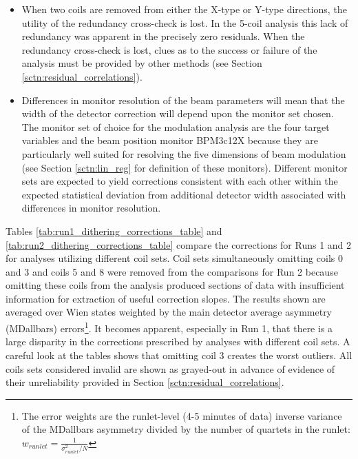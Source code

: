 \begin{itemize}
\item{When two coils are removed from either the X-type or Y-type directions, the utility of the redundancy cross-check is lost. In the 5-coil analysis this lack of redundancy was apparent in the precisely zero residuals. When the redundancy cross-check is lost, clues as to the success or failure of the analysis must be provided by other methods (see Section \ref{sctn:residual_correlations}).}
\item{Differences in monitor resolution of the beam parameters will mean that the width of the detector correction will depend upon the monitor set chosen. The monitor set of choice for the modulation analysis are the four target variables and the beam position monitor BPM3c12X because they are particularly well suited for resolving the five dimensions of beam modulation (see Section \ref{sctn:lin_reg} for definition of these monitors). Different monitor sets are expected to yield corrections consistent with each other within the expected statistical deviation from additional detector width associated with differences in monitor resolution.}
\end{itemize}

Tables \ref{tab:run1_dithering_corrections_table} and \ref{tab:run2_dithering_corrections_table} compare the corrections for Runs 1 and 2 for analyses utilizing different coil sets. Coil sets simultaneously omitting coils 0 and 3 and coils 5 and 8 were removed from the comparisons for Run 2 because omitting these coils from the analysis produced sections of data with insufficient information for extraction of useful correction slopes. The results shown are averaged over Wien states weighted by the main detector average asymmetry (MDallbars) errors\footnote{The error weights are the runlet-level (4-5 minutes of data) inverse variance of the MDallbars asymmetry divided by the number of quartets in the runlet: $w_{runlet}=\frac{1}{\sigma_{runlet}^2/N}$}. It becomes apparent, especially in Run 1, that there is a large disparity in the corrections prescribed by analyses with different coil sets. A careful look at the tables shows that omitting coil 3 creates the worst outliers. All coils sets considered invalid are shown as grayed-out in advance of evidence of their unreliability provided in Section \ref{sctn:residual_correlations}.

